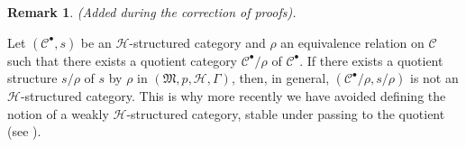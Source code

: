 \documentclass[a4paper,fleqn]{article}
\theoremstyle{plain}
\theoremstyle{definition}
\newtheorem*{remark}{Remark}
\newcommand{\CC}{\mathcal{C}}
\newcommand{\HH}{\mathcal{H}}
\newcommand{\MM}{\mathfrak{M}}
\begin{document}
\begin{remark}
  \emph{(Added during the correction of proofs).}

  Let $(\CC^\bullet,s)$ be an $\HH$-structured category and $\rho$ an equivalence relation on $\CC$ such that there exists a quotient category $\CC^\bullet/\rho$ of $\CC^\bullet$.
  If there exists a quotient structure \cite{3e} $s/\rho$ of $s$ by $\rho$ in $(\MM,p,\HH,\Gamma)$, then, in general, $(\CC^\bullet/\rho,s/\rho)$ is not an $\HH$-structured category.
  This is why more recently we have avoided defining the notion of a weakly $\HH$-structured category, stable under passing to the quotient (see \cite{coll66}).
\end{remark}






\begingroup
\let\clearpage\relax
  \printbibliography[keyword={orig},heading=bibintoc,title=Bibliography]
  \printbibliography[keyword={oc},title={Citations to the collected works}]
  \printbibliography[keyword={comm},title={Citations from comments in the collected works}]
\endgroup
\end{document}
